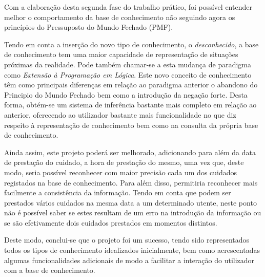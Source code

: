 \documentclass[a4paper]{article}
\begin{document}
\hspace{3mm} Com a elaboração desta segunda fase do trabalho prático, foi possível entender melhor o comportamento da base de conhecimento não seguindo agora os princípios do Pressuposto do Mundo Fechado (PMF).

Tendo em conta a inserção do novo tipo de conhecimento, o \emph{desconhecido}, a base de conhecimento tem uma maior capacidade de representação de situações próximas da realidade. Pode também chamar-se a esta mudança de paradigma como \emph{Extensão à Programação em Lógica}. Este novo conceito de conhecimento têm como principais diferenças em relação ao paradigma anterior o abandono do Principio do Mundo Fechado bem como a introdução da negação forte. Desta forma, obtém-se um sistema de inferência bastante mais completo em relação ao anterior, oferecendo ao utilizador bastante mais funcionalidade no que diz respeito à representação de conhecimento bem como na consulta da própria base de conhecimento.

Ainda assim, este projeto poderá ser melhorado, adicionando para além da data de prestação do cuidado, a hora de prestação do mesmo, uma vez que, deste modo, seria possível reconhecer com maior precisão cada um dos cuidados registados na base de conhecimento. Para além disso, permitiria reconhecer mais facilmente a consistência da informação. Tendo em conta que podem ser prestados vários cuidados na mesma data a um determinado utente, neste ponto não é possível saber se estes resultam de um erro na introdução da informação ou se são efetivamente dois cuidados prestados em momentos distintos.

Deste modo, conclui-se que o projeto foi um sucesso, tendo sido representados todos os tipos de conhecimento idealizados inicialmente, bem como acrescentadas algumas funcionalidades adicionais de modo a facilitar a interação do utilizador com a base de conhecimento.

\newpage
{}

\end{document}
